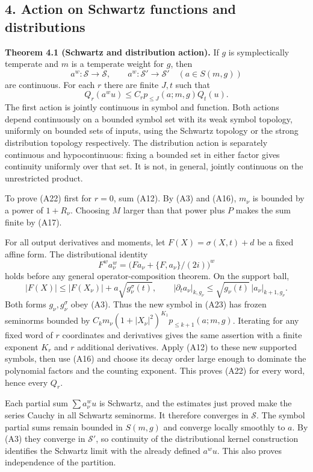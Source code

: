 \documentclass[
  11pt,
]{article}
\begin{document}
\subsection{4. Action on Schwartz functions and
distributions}\label{action-on-schwartz-functions-and-distributions}

\textbf{Theorem 4.1 (Schwartz and distribution action).} If \(g\) is
symplectically temperate and \(m\) is a temperate weight for \(g\), then
\[
a^w:\mathcal S\longrightarrow\mathcal S,\qquad
a^w:\mathcal S'\longrightarrow\mathcal S'
\quad(a\in S(m,g))
\tag{A21}
\] are continuous. For each \(r\) there are finite \(J,t\) such that \[
Q_r(a^wu)\le C_r p_{\le J}(a;m,g)Q_t(u).
\tag{A22}
\] The first action is jointly continuous in symbol and function. Both
actions depend continuously on a bounded symbol set with its weak symbol
topology, uniformly on bounded sets of inputs, using the Schwartz
topology or the strong distribution topology respectively. The
distribution action is separately continuous and hypocontinuous: fixing
a bounded set in either factor gives continuity uniformly over that set.
It is not, in general, jointly continuous on the unrestricted product.

To prove (A22) first for \(r=0\), sum (A12). By (A3) and (A16),
\(m_\nu\) is bounded by a power of \(1+R_\nu\). Choosing \(M\) larger
than that power plus \(P\) makes the sum finite by (A17).

For all output derivatives and moments, let \(F(X)=\sigma(X,t)+d\) be a
fixed affine form. The distributional identity \[
F^w a_\nu^w
=\big(Fa_\nu+\{F,a_\nu\}/(2i)\big)^w
\tag{A23}
\] holds before any general operator-composition theorem. On the support
ball, \[
|F(X)|\le |F(X_\nu)|+a\sqrt{g_\nu^\sigma(t)},\qquad
|\partial_t a_\nu|_{k,g_\nu}
\le \sqrt{g_\nu(t)}\,|a_\nu|_{k+1,g_\nu}.
\] Both forms \(g_\nu,g_\nu^\sigma\) obey (A3). Thus the new symbol in
(A23) has frozen seminorms bounded by
\(C_km_\nu(1+|X_\nu|^2)^{K_1}p_{\le k+1}(a;m,g)\). Iterating for any
fixed word of \(r\) coordinates and derivatives gives the same assertion
with a finite exponent \(K_r\) and \(r\) additional derivatives. Apply
(A12) to these new supported symbols, then use (A16) and choose its
decay order large enough to dominate the polynomial factors and the
counting exponent. This proves (A22) for every word, hence every
\(Q_r\).

Each partial sum \(\sum a_\nu^wu\) is Schwartz, and the estimates just
proved make the series Cauchy in all Schwartz seminorms. It therefore
converges in \(\mathcal S\). The symbol partial sums remain bounded in
\(S(m,g)\) and converge locally smoothly to \(a\). By (A3) they converge
in \(\mathcal S'\), so continuity of the distributional kernel
construction identifies the Schwartz limit with the already defined
\(a^wu\). This also proves independence of the partition.
\end{document}
